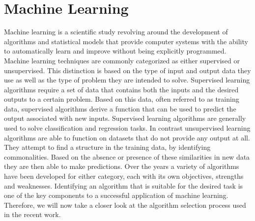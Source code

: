\section{Machine Learning}
Machine learning is a scientific study revolving around the development of algorithms and statistical models that provide computer systems with the ability to automatically learn and improve without being explicitly programmed. Machine learning techniques are commonly categorized as either supervised or unsupervised. This distinction is based on the type of input and output data they use as well as the type of problem they are intended to solve. Supervised learning algorithms require a set of data that contains both the inputs and the desired outputs to a certain problem. Based on this data, often referred to as training data, supervised algorithms derive a function that can be used to predict the output associated with new inputs. Supervised learning algorithms are generally used to solve classification and regression tasks. In contrast unsupervised learning algorithms are able to function on datasets that do not provide any output at all. They attempt to find a structure in the training data, by identifying commonalities. Based on the absence or presence of these similarities in new data they are then able to make predictions. 
Over the years a variety of algorithms have been developed for either category, each with its own objectives, strengths and weaknesses. Identifying an algorithm that is suitable for the desired task is one of the key components to a successful application of machine learning. Therefore, we will now take a closer look at the algorithm selection process used in the recent work. 
  
